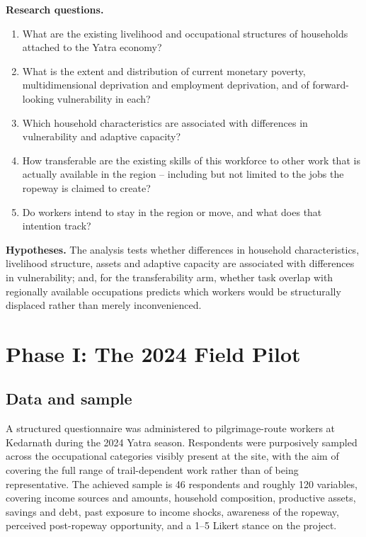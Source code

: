 \documentclass[11pt]{article}
\begin{document}
\textbf{Research questions.}
\begin{enumerate}
    \item What are the existing livelihood and occupational structures of households attached to the Yatra economy?
    \item What is the extent and distribution of current monetary poverty, multidimensional deprivation and employment deprivation, and of forward-looking vulnerability in each?
    \item Which household characteristics are associated with differences in vulnerability and adaptive capacity?
    \item How transferable are the existing skills of this workforce to other work that is actually available in the region -- including but not limited to the jobs the ropeway is claimed to create?
    \item Do workers intend to stay in the region or move, and what does that intention track?
\end{enumerate}

\textbf{Hypotheses.} The analysis tests whether differences in household characteristics,
livelihood structure, assets and adaptive capacity are associated with differences in
vulnerability; and, for the transferability arm, whether task overlap with regionally
available occupations predicts which workers would be structurally displaced rather than
merely inconvenienced.

\section{Phase I: The 2024 Field Pilot}\label{sec:pilot}

\subsection{Data and sample}

A structured questionnaire was administered to pilgrimage-route workers at Kedarnath during
the 2024 Yatra season. Respondents were purposively sampled across the occupational
categories visibly present at the site, with the aim of covering the full range of
trail-dependent work rather than of being representative. The achieved sample is 46
respondents and roughly 120 variables, covering income sources and amounts, household
composition, productive assets, savings and debt, past exposure to income shocks, awareness of
the ropeway, perceived post-ropeway opportunity, and a 1--5 Likert stance on the project.
\end{document}

